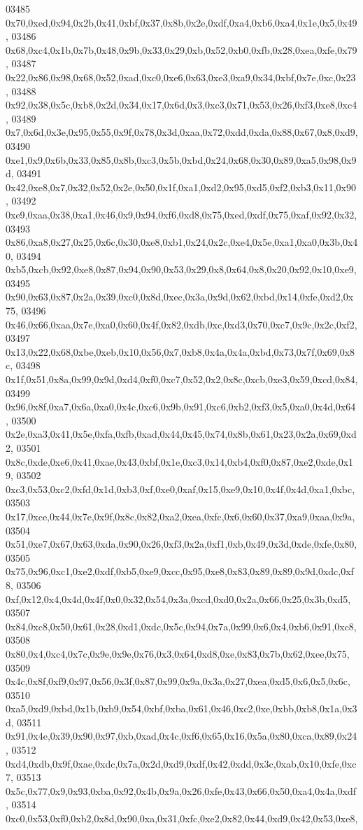 \begin{DoxyCode}
03485   0x70,0xed,0x94,0x2b,0x41,0xbf,0x37,0x8b,0x2e,0xdf,0xa4,0xb6,0xa4,0x1e,0x5,0x49,
03486   0x68,0xc4,0x1b,0x7b,0x48,0x9b,0x33,0x29,0xb,0x52,0xb0,0xfb,0x28,0xea,0xfe,0x79,
03487   0x22,0x86,0x98,0x68,0x52,0xad,0xc0,0xe6,0x63,0xe3,0xa9,0x34,0xbf,0x7e,0xc,0x23,
03488   0x92,0x38,0x5c,0xb8,0x2d,0x34,0x17,0x6d,0x3,0xc3,0x71,0x53,0x26,0xf3,0xe8,0xc4,
03489   0x7,0x6d,0x3e,0x95,0x55,0x9f,0x78,0x3d,0xaa,0x72,0xdd,0xda,0x88,0x67,0x8,0xd9,
03490   0xe1,0x9,0x6b,0x33,0x85,0x8b,0xc3,0x5b,0xbd,0x24,0x68,0x30,0x89,0xa5,0x98,0x9d,
03491   0x42,0xe8,0x7,0x32,0x52,0x2e,0x50,0x1f,0xa1,0xd2,0x95,0xd5,0xf2,0xb3,0x11,0x90,
03492   0xe9,0xaa,0x38,0xa1,0x46,0x9,0x94,0xf6,0xd8,0x75,0xed,0xdf,0x75,0xaf,0x92,0x32,
03493   0x86,0xa8,0x27,0x25,0x6c,0x30,0xe8,0xb1,0x24,0x2c,0xe4,0x5e,0xa1,0xa0,0x3b,0x40,
03494   0xb5,0xcb,0x92,0xe8,0x87,0x94,0x90,0x53,0x29,0x8,0x64,0x8,0x20,0x92,0x10,0xe9,
03495   0x90,0x63,0x87,0x2a,0x39,0xc0,0x8d,0xec,0x3a,0x9d,0x62,0xbd,0x14,0xfe,0xd2,0x75,
03496   0x46,0x66,0xaa,0x7e,0xa0,0x60,0x4f,0x82,0xdb,0xc,0xd3,0x70,0xc7,0x9c,0x2c,0xf2,
03497   0x13,0x22,0x68,0xbe,0xeb,0x10,0x56,0x7,0xb8,0x4a,0x4a,0xbd,0x73,0x7f,0x69,0x8c,
03498   0x1f,0x51,0x8a,0x99,0x9d,0xd4,0xf0,0xc7,0x52,0x2,0x8c,0xcb,0xe3,0x59,0xcd,0x84,
03499   0x96,0x8f,0xa7,0x6a,0xa0,0x4c,0xc6,0x9b,0x91,0xc6,0xb2,0xf3,0x5,0xa0,0x4d,0x64,
03500   0x2e,0xa3,0x41,0x5e,0xfa,0xfb,0xad,0x44,0x45,0x74,0x8b,0x61,0x23,0x2a,0x69,0xd2,
03501   0x8c,0xde,0xe6,0x41,0xae,0x43,0xbf,0x1e,0xc3,0x14,0xb4,0xf0,0x87,0xe2,0xde,0x19,
03502   0xc3,0x53,0xc2,0xfd,0x1d,0xb3,0xf,0xe0,0xaf,0x15,0xe9,0x10,0x4f,0x4d,0xa1,0xbc,
03503   0x17,0xce,0x44,0x7e,0x9f,0x8c,0x82,0xa2,0xea,0xfc,0x6,0x60,0x37,0xa9,0xaa,0x9a,
03504   0x51,0xe7,0x67,0x63,0xda,0x90,0x26,0xf3,0x2a,0xf1,0xb,0x49,0x3d,0xde,0xfe,0x80,
03505   0x75,0x96,0xc1,0xe2,0xdf,0xb5,0xe9,0xcc,0x95,0xe8,0x83,0x89,0x89,0x9d,0xdc,0xf8,
03506   0xf,0x12,0x4,0x4d,0x4f,0x0,0x32,0x54,0x3a,0xcd,0xd0,0x2a,0x66,0x25,0x3b,0xd5,
03507   0x84,0xc8,0x50,0x61,0x28,0xd1,0xdc,0x5c,0x94,0x7a,0x99,0x6,0x4,0xb6,0x91,0xc8,
03508   0x80,0x4,0xc4,0x7c,0x9e,0x9e,0x76,0x3,0x64,0xd8,0xe,0x83,0x7b,0x62,0xee,0x75,
03509   0x4c,0x8f,0xf9,0x97,0x56,0x3f,0x87,0x99,0x9a,0x3a,0x27,0xea,0xd5,0x6,0x5,0x6c,
03510   0xa5,0xd9,0xbd,0x1b,0xb9,0x54,0xbf,0xba,0x61,0x46,0xc2,0xe,0xbb,0xb8,0x1a,0x3d,
03511   0x91,0x4e,0x39,0x90,0x97,0xb,0xad,0x4c,0xf6,0x65,0x16,0x5a,0x80,0xca,0x89,0x24,
03512   0xd4,0xdb,0x9f,0xae,0xdc,0x7a,0x2d,0xd9,0xdf,0x42,0xdd,0x3c,0xab,0x10,0xfe,0xc7,
03513   0x5c,0x77,0x9,0x93,0xba,0x92,0x4b,0x9a,0x26,0xfe,0x43,0x66,0x50,0xa4,0x4a,0xdf,
03514   0xc0,0x53,0xf0,0xb2,0x8d,0x90,0xa,0x31,0xfc,0xe2,0x82,0x44,0xd9,0x42,0x53,0xe8,

\end{DoxyCode}
